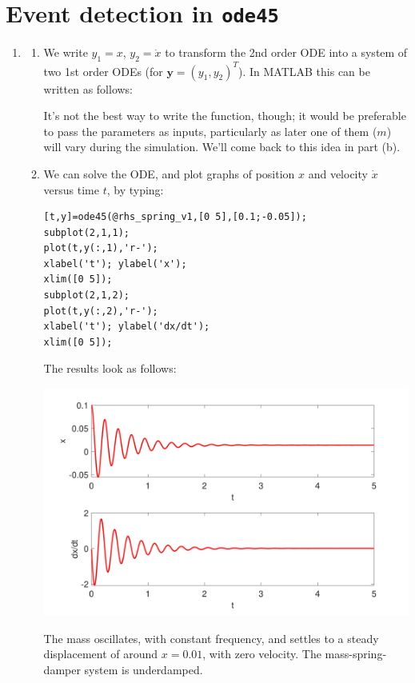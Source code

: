\documentclass[a4paper,11pt]{article}
\newcommand{\matlab}[1]{\texttt{#1}}
\renewcommand{\vec}[1]{\boldsymbol{#1}}
\begin{document}
\section{Event detection in \matlab{ode45}}

\begin{enumerate}

\item
\begin{enumerate}
  \item We write $y_1=x$, $y_2=\dot{x}$ to transform the 2nd order ODE into a system of two 1st order
    ODEs (for $\vec{y}=(y_1,y_2)^T$). In MATLAB this can be written as follows:
    
    
    It's not the best way to write the function, though; it would be preferable to pass the parameters as inputs, particularly as later one of them ($m$) will vary during the simulation. We'll come back to this idea in part (b).
    
  \item We can solve the ODE, and plot graphs of position $x$ and velocity $\dot{x}$ versus time $t$, by typing:
\begin{lstlisting}
[t,y]=ode45(@rhs_spring_v1,[0 5],[0.1;-0.05]);
subplot(2,1,1);
plot(t,y(:,1),'r-');
xlabel('t'); ylabel('x');
xlim([0 5]);
subplot(2,1,2);
plot(t,y(:,2),'r-');
xlabel('t'); ylabel('dx/dt');
xlim([0 5]);
\end{lstlisting}

The results look as follows:
\begin{center}
\includegraphics[width=0.9\linewidth]{images/Q2a.pdf}
\end{center}
The mass oscillates, with constant frequency, and settles to a steady displacement of around $x=0.01$, with zero velocity. The mass-spring-damper system is underdamped.
    

\end{enumerate}
\end{enumerate}
\end{document}
